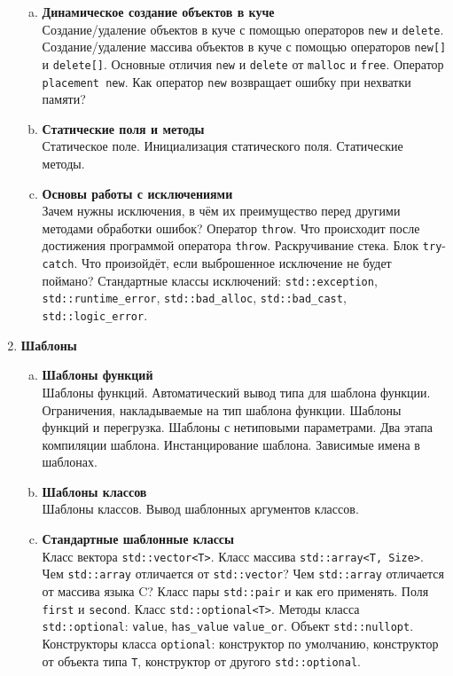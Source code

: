 \documentclass{article}
\begin{document}
\begin{enumerate}
\begin{enumerate}[a.]
\item \textbf{Динамическое создание объектов в куче}\\
Создание/удаление объектов в куче с помощью операторов \texttt{new} и \texttt{delete}. Создание/удаление массива объектов в куче с помощью операторов \texttt{new[]} и \texttt{delete[]}. Основные отличия \texttt{new} и \texttt{delete} от \texttt{malloc} и \texttt{free}. Оператор \texttt{placement new}. Как оператор \texttt{new} возвращает ошибку при нехватки памяти?

\item \textbf{Статические поля и методы}\\
Статическое поле. Инициализация статического поля. Статические методы.


\item \textbf{Основы работы с исключениями}\\
Зачем нужны исключения, в чём их преимущество перед другими методами обработки ошибок? Оператор \texttt{throw}. Что происходит после достижения программой оператора \texttt{throw}. Раскручивание стека. Блок \texttt{try}-\texttt{catch}. Что произойдёт, если выброшенное исключение не будет поймано? Стандартные классы исключений: \texttt{std::exception}, \texttt{std::runtime\_error}, \texttt{std::bad\_alloc}, \texttt{std::bad\_cast}, \texttt{std::logic\_error}.


\end{enumerate}





\item \textbf{Шаблоны}

\begin{enumerate}[a.]
\item \textbf{Шаблоны функций}\\
Шаблоны функций. Автоматический вывод типа для шаблона функции. Ограничения, накладываемые на тип шаблона функции. Шаблоны функций и перегрузка. Шаблоны с нетиповыми параметрами. Два этапа компиляции шаблона. Инстанцирование шаблона. Зависимые имена в шаблонах.

\item \textbf{Шаблоны классов}\\
Шаблоны классов. Вывод шаблонных аргументов классов. 

\item \textbf{Стандартные шаблонные классы}\\
Класс вектора \texttt{std::vector<T>}. Класс массива \texttt{std::array<T, Size>}. Чем \texttt{std::array} отличается от \texttt{std::vector}? Чем \texttt{std::array} отличается от массива языка C? Класс пары \texttt{std::pair} и как его применять. Поля \texttt{first} и \texttt{second}.
Класс \texttt{std::optional<T>}. Методы класса \texttt{std::optional}: \texttt{value},  \texttt{has\_value} \texttt{value\_or}. Объект \texttt{std::nullopt}. Конструкторы класса \texttt{optional}: конструктор по умолчанию, конструктор от объекта типа \texttt{T}, конструктор от другого \texttt{std::optional}.



\end{enumerate}
\end{enumerate}
\end{document}
